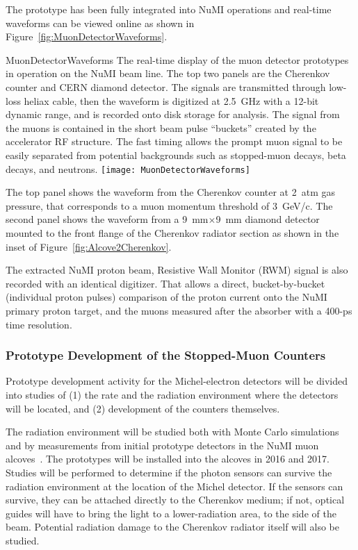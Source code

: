 The prototype has been %
fully integrated into NuMI operations and
real-time waveforms can be viewed online as shown in
Figure~\ref{fig:MuonDetectorWaveforms}.
\begin{cdrfigure}{MuonDetectorWaveforms}
{The real-time display of the muon detector prototypes in operation
on the NuMI beam line. The top two panels are the Cherenkov counter
and CERN diamond detector. The signals are
transmitted through low-loss heliax cable, then the waveform
is digitized at 2.5~GHz with a 12-bit dynamic range, and is
recorded onto disk storage for analysis. The signal from the
muons is contained in the short beam pulse ``buckets'' created
by the accelerator RF structure. The fast timing allows the
prompt muon signal to be easily separated from potential backgrounds
such as stopped-muon decays, beta decays, and neutrons.}
\texttt{[image: MuonDetectorWaveforms]}
\end{cdrfigure}
The top panel shows the waveform from the Cherenkov counter at 2~atm
gas pressure, that corresponds to a muon momentum threshold of
3~GeV/c. The second panel shows the waveform from a 9~mm$\times$9~mm
diamond detector mounted to the front flange of the Cherenkov radiator
section as shown in the inset of Figure~\ref{fig:Alcove2Cherenkov}.

The extracted NuMI proton beam, Resistive Wall Monitor (RWM) signal is
also recorded with an identical digitizer.  That allows a direct,
bucket-by-bucket (individual proton pulses) comparison of the proton
current onto the NuMI primary proton target, and the muons measured
after the absorber with a 400-ps time resolution.

\subsubsection{Prototype Development of the Stopped-Muon Counters}

Prototype development activity for the Michel-electron detectors will
be divided into studies of (1) the rate  and the radiation environment where
the detectors will be located, and (2) development of the counters
themselves.

The radiation environment will be studied both with Monte Carlo
simulations and by measurements from initial prototype detectors
in the NuMI muon alcoves~\cite{ref:NuMIBeamMonitors}.
The prototypes will be installed into the alcoves in 2016 and 2017.
Studies will be performed to determine if the photon sensors
can survive the radiation environment at the location of the Michel
detector. If the sensors can survive, they can be attached directly to
the Cherenkov medium; if not, optical guides will have to bring the
light to a lower-radiation area, to the side of the beam. Potential
radiation damage to the Cherenkov radiator itself will also be
studied.

